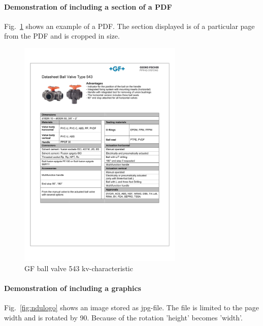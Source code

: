 \paragraph{Demonstration of including a section of a PDF}
Fig.~\ref{fig:GF543kv} shows an example of a PDF. The section displayed is of a particular page from the PDF and is cropped in size.
\begin{figure}
	\centering
	\includegraphics[width=0.7\textwidth,page=6, trim = 25mm 172mm 25mm 45mm, clip]{600-Appendices/Examples/Datasheet_GF_543}
	\caption{GF ball valve 543 kv-characteristic}
	\label{fig:GF543kv}
\end{figure}

\paragraph{Demonstration of including a graphics}
Fig.~\ref{fig:ndulogo} shows an image stored as jpg-file. The file is limited to the page width and is rotated by 90\textdegree. Because of the rotation 'height' becomes 'width'.

